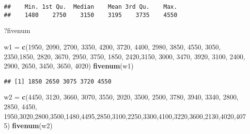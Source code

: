 \documentclass[
]{article}
\newenvironment{Shaded}{\begin{snugshade}}{\end{snugshade}}
\newcommand{\DecValTok}[1]{\textcolor[rgb]{0.00,0.00,0.81}{#1}}
\newcommand{\FunctionTok}[1]{\textcolor[rgb]{0.13,0.29,0.53}{\textbf{#1}}}
\newcommand{\NormalTok}[1]{#1}
\newcommand{\OtherTok}[1]{\textcolor[rgb]{0.56,0.35,0.01}{#1}}
\begin{document}
\begin{verbatim}
##    Min. 1st Qu.  Median    Mean 3rd Qu.    Max. 
##    1480    2750    3150    3195    3735    4550
\end{verbatim}

\begin{Shaded}
\begin{Highlighting}[]
\NormalTok{?fivenum}
\end{Highlighting}
\end{Shaded}

\begin{Shaded}
\begin{Highlighting}[]
\NormalTok{w1 }\OtherTok{=} \FunctionTok{c}\NormalTok{(}\DecValTok{1950}\NormalTok{, }\DecValTok{2090}\NormalTok{, }\DecValTok{2700}\NormalTok{, }\DecValTok{3350}\NormalTok{, }\DecValTok{4200}\NormalTok{, }\DecValTok{3720}\NormalTok{, }\DecValTok{4400}\NormalTok{, }\DecValTok{2980}\NormalTok{, }\DecValTok{3850}\NormalTok{, }\DecValTok{4550}\NormalTok{, }\DecValTok{3050}\NormalTok{, }\DecValTok{2350}\NormalTok{,}\DecValTok{1850}\NormalTok{, }\DecValTok{2820}\NormalTok{, }\DecValTok{3670}\NormalTok{, }\DecValTok{2950}\NormalTok{, }\DecValTok{3750}\NormalTok{, }\DecValTok{1850}\NormalTok{, }\DecValTok{2420}\NormalTok{,}\DecValTok{3150}\NormalTok{, }\DecValTok{3000}\NormalTok{, }\DecValTok{3470}\NormalTok{, }\DecValTok{3920}\NormalTok{, }\DecValTok{3100}\NormalTok{, }\DecValTok{2400}\NormalTok{, }\DecValTok{2900}\NormalTok{, }\DecValTok{2650}\NormalTok{, }\DecValTok{3450}\NormalTok{, }\DecValTok{3650}\NormalTok{, }\DecValTok{4020}\NormalTok{)}
\FunctionTok{fivenum}\NormalTok{(w1)}
\end{Highlighting}
\end{Shaded}

\begin{verbatim}
## [1] 1850 2650 3075 3720 4550
\end{verbatim}

\begin{Shaded}
\begin{Highlighting}[]
\NormalTok{w2 }\OtherTok{=} \FunctionTok{c}\NormalTok{(}\DecValTok{4450}\NormalTok{, }\DecValTok{3120}\NormalTok{, }\DecValTok{3660}\NormalTok{, }\DecValTok{3070}\NormalTok{, }\DecValTok{3550}\NormalTok{, }\DecValTok{2020}\NormalTok{, }\DecValTok{3500}\NormalTok{, }\DecValTok{2500}\NormalTok{, }\DecValTok{3780}\NormalTok{, }\DecValTok{3940}\NormalTok{, }\DecValTok{3340}\NormalTok{, }\DecValTok{2800}\NormalTok{, }\DecValTok{2850}\NormalTok{, }\DecValTok{4450}\NormalTok{, }\DecValTok{1950}\NormalTok{,}\DecValTok{3020}\NormalTok{,}\DecValTok{2800}\NormalTok{,}\DecValTok{3500}\NormalTok{,}\DecValTok{1480}\NormalTok{,}\DecValTok{4495}\NormalTok{,}\DecValTok{2850}\NormalTok{,}\DecValTok{3100}\NormalTok{,}\DecValTok{2250}\NormalTok{,}\DecValTok{3300}\NormalTok{,}\DecValTok{4100}\NormalTok{,}\DecValTok{3220}\NormalTok{,}\DecValTok{3600}\NormalTok{,}\DecValTok{2130}\NormalTok{,}\DecValTok{4020}\NormalTok{,}\DecValTok{4075}\NormalTok{)}
\FunctionTok{fivenum}\NormalTok{(w2)}
\end{Highlighting}
\end{Shaded}
\end{document}
